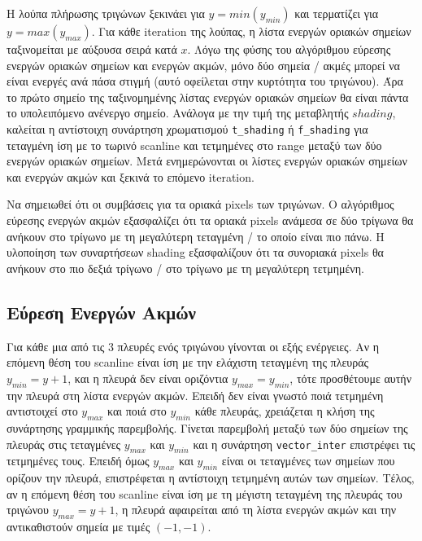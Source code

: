 \documentclass{article}
\begin{document}
Η λούπα πλήρωσης τριγώνων ξεκινάει για $y = min(y_{min})$ και τερματίζει για
$y = max(y_{max})$. Για κάθε iteration της λούπας, η λίστα ενεργών οριακών 
σημείων ταξινομείται με αύξουσα σειρά κατά $x$. Λόγω της φύσης του αλγόριθμου 
εύρεσης ενεργών οριακών σημείων και ενεργών ακμών, μόνο δύο σημεία / ακμές 
μπορεί να είναι ενεργές ανά πάσα στιγμή (αυτό οφείλεται στην κυρτότητα του
τριγώνου). Άρα το πρώτο σημείο της ταξινομημένης λίστας ενεργών οριακών σημείων
θα είναι πάντα το υπολειπόμενο ανένεργο σημείο. Ανάλογα με την τιμή της μεταβλητής 
$shading$, καλείται η αντίστοιχη συνάρτηση χρωματισμού \verb|t_shading| ή 
\verb|f_shading| για τεταγμένη ίση με το τωρινό scanline και τετμημένες στο range 
μεταξύ των δύο ενεργών οριακών σημείων. Μετά ενημερώνονται οι λίστες 
ενεργών οριακών σημείων και ενεργών ακμών και ξεκινά το επόμενο iteration.

Να σημειωθεί ότι οι συμβάσεις για τα οριακά pixels των τριγώνων. Ο
αλγόριθμος εύρεσης ενεργών ακμών εξασφαλίζει ότι τα οριακά pixels ανάμεσα 
σε δύο τρίγωνα θα ανήκουν στο τρίγωνο με τη μεγαλύτερη τεταγμένη / το οποίο
είναι πιο πάνω. Η υλοποίηση των συναρτήσεων shading εξασφαλίζουν ότι 
τα συνοριακά pixels θα ανήκουν στο πιο δεξιά τρίγωνο / στο τρίγωνο με
τη μεγαλύτερη τετμημένη.

\subsection{Εύρεση Ενεργών Ακμών}
Για κάθε μια από τις 3 πλευρές ενός τριγώνου γίνονται οι εξής ενέργειες.
Αν η επόμενη θέση του scanline είναι ίση με την ελάχιστη τεταγμένη της πλευράς
$y_{min} = y + 1$, και η πλευρά δεν είναι οριζόντια $y_{max} = y_{min}$, τότε 
προσθέτουμε αυτήν την πλευρά στη λίστα ενεργών ακμών. Επειδή δεν είναι
γνωστό ποιά τετμημένη αντιστοιχεί στο $y_{max}$ και ποιά στο $y_{min}$
κάθε πλευράς, χρειάζεται η κλήση της συνάρτησης γραμμικής παρεμβολής.
Γίνεται παρεμβολή μεταξύ των δύο σημείων της πλευράς στις τεταγμένες
$y_{max}$ και $y_{min}$ και η συνάρτηση \verb|vector_inter| επιστρέφει
τις τετμημένες τους. Επειδή
όμως $y_{max}$ και $y_{min}$ είναι οι τεταγμένες των σημείων που
ορίζουν την πλευρά,
επιστρέφεται η αντίστοιχη τετμημένη αυτών των σημείων.
Τέλος, αν η επόμενη θέση του scanline είναι ίση με τη μέγιστη τεταγμένη
της πλευράς του τριγώνου $y_{max} = y + 1$, η πλευρά αφαιρείται 
από τη λίστα ενεργών ακμών και την αντικαθιστούν σημεία με τιμές $(-1, -1)$.
\end{document}
